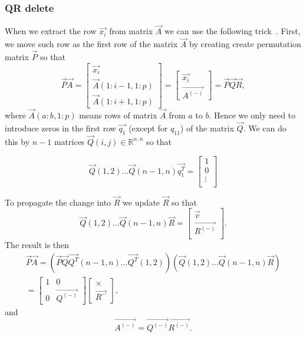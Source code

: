 \subsubsection*{QR delete}
When we extract the row $\vec{x_i}$ from matrix $\vec{A}$ we can use the following trick~\cite{hammarling2008updatingqr}. First, we move such row as the first row of the matrix $\vec{A}$ by creating create permutation matrix $\vec{P}$ so that 
\begin{equation}
    \vec{P}\vec{A} = \begin{bmatrix}
        \vec{x_i} \\
        \vec{A}(1:i-1 , 1:p) \\
        \vec{A}(1:i+1 , 1:p) 
    \end{bmatrix}
    = 
    \begin{bmatrix}
        \vec{x_i} \\
        \vec{A^{(-)}}
    \end{bmatrix}
    = \vec{P}\vec{Q}\vec{R},
\end{equation} 
where $\vec{A}(a:b , 1:p) $ means rows of matrix $\vec{A}$ from $a$ to $b$.
Hence we only need to introduce zeros in the first row $\vec{q_1}$ (except for $q_{11}$) of the matrix $\vec{Q}$. We can do this by $n-1$ matrices $\vec{Q}(i,j) \in \mathbb{R}^{n, n}$ so that

\begin{equation}
    \vec{Q}(1,2) \ldots \vec{Q}(n-1,n)\vec{q_1^T} =     \begin{bmatrix}
        1 \\
        0\\
        \vdots \\
    \end{bmatrix}
\end{equation}

To propagate the change into $\vec{R}$ we update $\vec{R}$ so that
\begin{equation}
    \vec{Q}(1,2) \ldots \vec{Q}(n-1,n) \vec{R} =   \begin{bmatrix}
        \vec{v} \\
        \vec{R^{(-)}}\\
    \end{bmatrix}.
\end{equation}
The result is then
\begin{multline}
    \vec{P}\vec{A} = (\vec{P}\vec{Q}  \vec{Q^T}(n-1,n) \ldots   \vec{Q^T}(1,2)) (\vec{Q}(1,2) \ldots \vec{Q}(n-1,n) \vec{R} ) \\
    = 
    \begin{bmatrix}
        1 & 0 \\
        0 & \vec{Q^{(-)}}
    \end{bmatrix}
    \begin{bmatrix}
        \times \\
        \vec{R^{-}}
    \end{bmatrix},
\end{multline}
and 
\begin{equation}
    \vec{A^{(-)}} = \vec{Q^{(-)}}\vec{R^{(-)}}.
\end{equation}

